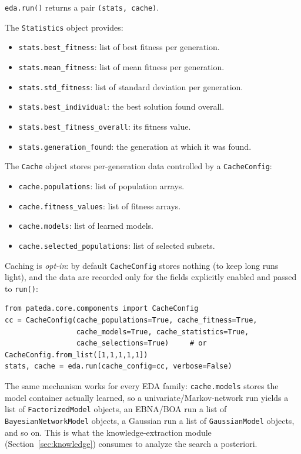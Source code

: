 \documentclass[a4paper,11pt]{article}
\begin{document}
\texttt{eda.run()} returns a pair \texttt{(stats, cache)}.

The \texttt{Statistics} object provides:
\begin{itemize}
  \item \texttt{stats.best\_fitness}: list of best fitness per generation.
  \item \texttt{stats.mean\_fitness}: list of mean fitness per generation.
  \item \texttt{stats.std\_fitness}: list of standard deviation per generation.
  \item \texttt{stats.best\_individual}: the best solution found overall.
  \item \texttt{stats.best\_fitness\_overall}: its fitness value.
  \item \texttt{stats.generation\_found}: the generation at which it was found.
\end{itemize}

The \texttt{Cache} object stores per-generation data controlled by a
\texttt{CacheConfig}:
\begin{itemize}
  \item \texttt{cache.populations}: list of population arrays.
  \item \texttt{cache.fitness\_values}: list of fitness arrays.
  \item \texttt{cache.models}: list of learned models.
  \item \texttt{cache.selected\_populations}: list of selected subsets.
\end{itemize}

Caching is \emph{opt-in}: by default \texttt{CacheConfig} stores nothing (to
keep long runs light), and the data are recorded only for the fields explicitly
enabled and passed to \texttt{run()}:

\begin{lstlisting}
from pateda.core.components import CacheConfig
cc = CacheConfig(cache_populations=True, cache_fitness=True,
                 cache_models=True, cache_statistics=True,
                 cache_selections=True)     # or CacheConfig.from_list([1,1,1,1,1])
stats, cache = eda.run(cache_config=cc, verbose=False)
\end{lstlisting}

The same mechanism works for every EDA family: \texttt{cache.models} stores the
model container actually learned, so a univariate/Markov-network run yields a
list of \texttt{FactorizedModel} objects, an EBNA/BOA run a list of
\texttt{BayesianNetworkModel} objects, a Gaussian run a list of
\texttt{GaussianModel} objects, and so on. This is what the knowledge-extraction
module (Section~\ref{sec:knowledge}) consumes to analyze the search a posteriori.
\end{document}

